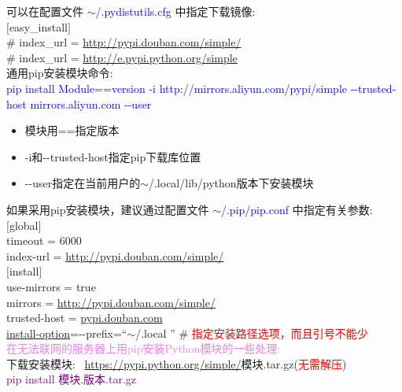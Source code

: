 \documentclass[10pt,a4paper]{article}
\begin{document}
可以在配置文件 \textcolor{blue}{$\sim$/.pydistutils.cfg} 中指定下载镜像:\\
$[$easy\_install$]$\\
\# index\_url = \url{http://pypi.douban.com/simple/} \\
\# index\_url = \url{http://e.pypi.python.org/simple} \\

通用\textrm{pip}安装模块命令:\\
\textcolor{blue}{\textrm{pip install Module==version -i http://mirrors.aliyun.com/pypi/simple -\/-trusted-host mirrors.aliyun.com -\/-user}}\\
\begin{itemize}
	\item 模块用\textrm{==}指定版本
	\item \textrm{-i}和\textrm{-\/-trusted-host}指定\textrm{pip}下载库位置
	\item \textrm{-\/-}user指定在当前用户的{$\sim$/.local/lib/python}版本下安装模块
\end{itemize}

如果采用\textrm{pip}安装模块，建议通过配置文件 \textcolor{blue}{$\sim$/.pip/pip.conf} 中指定有关参数:\\
$[$global$]$\\
timeout = 6000\\
index-url = \url{http://pypi.douban.com/simple/} \\
$[$install$]$\\
use-mirrors = true\\
mirrors = \url{http://pypi.douban.com/simple/} \\
trusted-host = \url{pypi.douban.com} \\
\underline{install-option}=-\/-prefix=``$\sim$/.local '' \# \textcolor{red}{指定安装路径选项，而且引号不能少} \\

\textcolor{violet}{在无法联网的服务器上用\textrm{pip}安装\textrm{Python}模块的一些处理:}\\
下载安装模块:~ \textrm{\url{https://pypi.python.org/simple/}}模块.tar.gz\:\:\:(\textcolor{red}{无需解压})\\
\textcolor{purple}{pip install 模块.版本.tar.gz}\\
\end{document}
